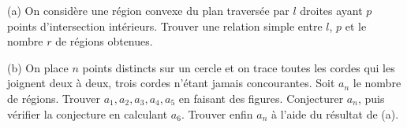 (a) On considère une région convexe du plan traversée par $l$ droites ayant $p$ points d'intersection intérieurs. Trouver une relation simple entre $l$, $p$ et le nombre $r$ de régions obtenues.

(b) On place $n$ points distincts sur un cercle et on trace toutes les cordes qui les joignent deux à deux, trois cordes n'étant jamais concourantes. Soit $a_n$ le nombre de régions. Trouver $a_1, a_2, a_3, a_4, a_5$ en faisant des figures. Conjecturer $a_n$, puis vérifier la conjecture en calculant $a_6$. Trouver enfin $a_n$ à l'aide du résultat de (a).

